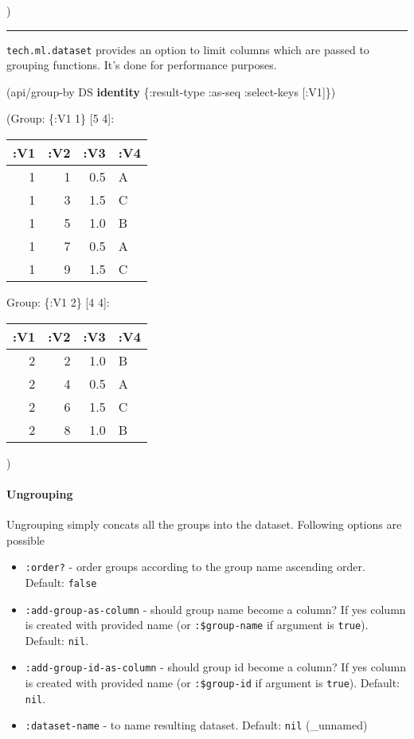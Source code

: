 \documentclass[]{article}
\newenvironment{Shaded}{\begin{snugshade}}{\end{snugshade}}
\newcommand{\KeywordTok}[1]{\textcolor[rgb]{0.13,0.29,0.53}{\textbf{#1}}}
\newcommand{\AttributeTok}[1]{\textcolor[rgb]{0.77,0.63,0.00}{#1}}
\newcommand{\NormalTok}[1]{#1}
\providecommand{\tightlist}{%
  \setlength{\itemsep}{0pt}\setlength{\parskip}{0pt}}
\let\oldparagraph\paragraph
\renewcommand{\paragraph}[1]{\oldparagraph{#1}\mbox{}}
\begin{document}
)

\begin{center}\rule{0.5\linewidth}{0.5pt}\end{center}

\texttt{tech.ml.dataset} provides an option to limit columns which are
passed to grouping functions. It's done for performance purposes.

\begin{Shaded}
\begin{Highlighting}[]
\NormalTok{(api/group-by DS }\KeywordTok{identity}\NormalTok{ \{}\AttributeTok{:result-type} \AttributeTok{:as-seq}
                           \AttributeTok{:select-keys}\NormalTok{ [}\AttributeTok{:V1}\NormalTok{]\})}
\end{Highlighting}
\end{Shaded}

(Group: \{:V1 1\} {[}5 4{]}:

\begin{longtable}[]{@{}rrrl@{}}
\toprule
:V1 & :V2 & :V3 & :V4\tabularnewline
\midrule
\endhead
1 & 1 & 0.5 & A\tabularnewline
1 & 3 & 1.5 & C\tabularnewline
1 & 5 & 1.0 & B\tabularnewline
1 & 7 & 0.5 & A\tabularnewline
1 & 9 & 1.5 & C\tabularnewline
\bottomrule
\end{longtable}

Group: \{:V1 2\} {[}4 4{]}:

\begin{longtable}[]{@{}rrrl@{}}
\toprule
:V1 & :V2 & :V3 & :V4\tabularnewline
\midrule
\endhead
2 & 2 & 1.0 & B\tabularnewline
2 & 4 & 0.5 & A\tabularnewline
2 & 6 & 1.5 & C\tabularnewline
2 & 8 & 1.0 & B\tabularnewline
\bottomrule
\end{longtable}

)

\paragraph{Ungrouping}\label{ungrouping}

Ungrouping simply concats all the groups into the dataset. Following
options are possible

\begin{itemize}
\tightlist
\item
  \texttt{:order?} - order groups according to the group name ascending
  order. Default: \texttt{false}
\item
  \texttt{:add-group-as-column} - should group name become a column? If
  yes column is created with provided name (or \texttt{:\$group-name} if
  argument is \texttt{true}). Default: \texttt{nil}.
\item
  \texttt{:add-group-id-as-column} - should group id become a column? If
  yes column is created with provided name (or \texttt{:\$group-id} if
  argument is \texttt{true}). Default: \texttt{nil}.
\item
  \texttt{:dataset-name} - to name resulting dataset. Default:
  \texttt{nil} (\_unnamed)
\end{itemize}
\end{document}
